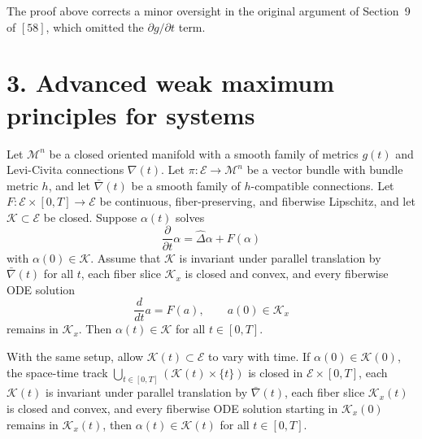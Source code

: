 \begin{remark}
\label{ch04-rem-tensor-maximum-principle-oversight}
The proof above corrects a minor oversight in the original argument of Section~9 of \([58]\), which omitted the \(\partial g/\partial t\) term.
\end{remark}

\section*{3. Advanced weak maximum principles for systems}

\begin{theorem}
\label{ch04-thm-tensor-max-principle-ode-pde}
Let \(\mathcal M^n\) be a closed oriented manifold with a smooth family of metrics \(g(t)\) and Levi-Civita connections \(\nabla(t)\). Let \(\pi:\mathcal E\to\mathcal M^n\) be a vector bundle with bundle metric \(h\), and let \(\bar\nabla(t)\) be a smooth family of \(h\)-compatible connections. Let \(F:\mathcal E\times[0,T]\to\mathcal E\) be continuous, fiber-preserving, and fiberwise Lipschitz, and let \(\mathcal K\subset \mathcal E\) be closed. Suppose \(\alpha(t)\) solves
\[
\frac{\partial}{\partial t}\alpha=\hat\Delta\alpha+F(\alpha)
\]
with \(\alpha(0)\in\mathcal K\). Assume that \(\mathcal K\) is invariant under parallel translation by \(\bar\nabla(t)\) for all \(t\), each fiber slice \(\mathcal K_x\) is closed and convex, and every fiberwise ODE solution
\[
\frac{d}{dt}a=F(a),\qquad a(0)\in \mathcal K_x
\]
remains in \(\mathcal K_x\). Then \(\alpha(t)\in\mathcal K\) for all \(t\in[0,T]\).
\end{theorem}

\begin{theorem}
\label{ch04-thm-tensor-max-principle-time-dependent}
With the same setup, allow \(\mathcal K(t)\subset\mathcal E\) to vary with time. If \(\alpha(0)\in \mathcal K(0)\), the space-time track \(\bigcup_{t\in[0,T]}(\mathcal K(t)\times\{t\})\) is closed in \(\mathcal E\times[0,T]\), each \(\mathcal K(t)\) is invariant under parallel translation by \(\bar\nabla(t)\), each fiber slice \(\mathcal K_x(t)\) is closed and convex, and every fiberwise ODE solution starting in \(\mathcal K_x(0)\) remains in \(\mathcal K_x(t)\), then \(\alpha(t)\in\mathcal K(t)\) for all \(t\in[0,T]\).
\end{theorem}

